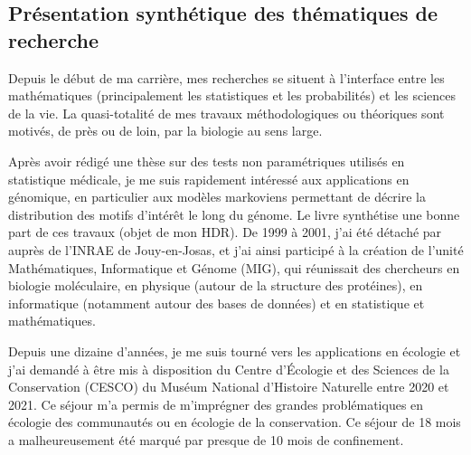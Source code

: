 \subsection{Présentation synthétique des thématiques de recherche}

Depuis le début de ma carrière, mes recherches se situent à l'interface entre les mathématiques (principalement les statistiques et les probabilités) et les sciences de la vie. La quasi-totalité de mes travaux méthodologiques ou théoriques sont motivés, de près ou de loin, par la biologie au sens large. 

Après avoir rédigé une thèse sur des tests non paramétriques utilisés en statistique médicale, je me suis rapidement intéressé aux applications en génomique, en particulier aux modèles markoviens permettant de décrire la distribution des motifs d'intérêt le long du génome. Le livre \cite{RRS06} synthétise une bonne part de ces travaux (objet de mon HDR). De 1999 à 2001, j'ai été détaché par \APT auprès de l'INRAE de Jouy-en-Josas, et j'ai ainsi participé à la création de l'unité Mathématiques, Informatique et Génome (MIG), qui réunissait des chercheurs en biologie moléculaire, en physique (autour de la structure des protéines), en informatique (notamment autour des bases de données) et en statistique et mathématiques. 

Depuis une dizaine d’années, je me suis tourné vers les applications en écologie et j'ai demandé à être mis à disposition du Centre d'Écologie et des Sciences de la Conservation (CESCO) du Muséum National d'Histoire Naturelle entre 2020 et 2021. Ce séjour m’a permis de m’imprégner des grandes problématiques en écologie des communautés ou en écologie de la conservation. Ce séjour de 18 mois a malheureusement été marqué par presque de 10 mois de confinement.

